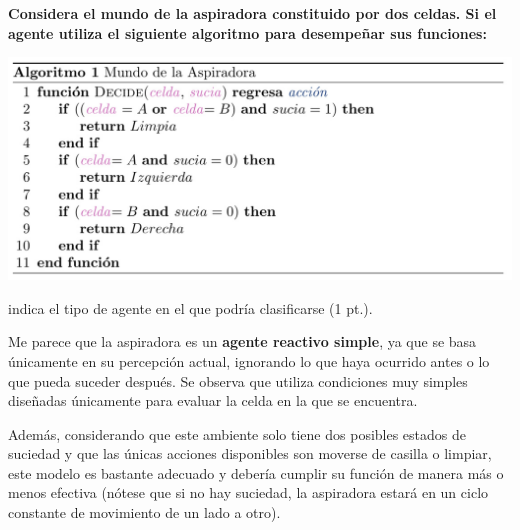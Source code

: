 \textbf{Considera el mundo de la aspiradora constituido por dos celdas. Si el agente utiliza el siguiente algoritmo para desempeñar sus funciones:}

\includegraphics[width=16cm]{src/Img/Screenshot_20250224_024900.png}

indica el tipo de agente en el que podría clasificarse (1 pt.). \vspace{.3cm}

Me parece que la aspiradora es un \textbf{agente reactivo simple}, ya que se basa únicamente en su percepción actual, ignorando lo que haya ocurrido antes o lo que pueda suceder después. Se observa que utiliza condiciones muy simples diseñadas únicamente para evaluar la celda en la que se encuentra. \vspace{.2cm}

Además, considerando que este ambiente solo tiene dos posibles estados de suciedad y que las únicas acciones disponibles son moverse de casilla o limpiar, este modelo es bastante adecuado y debería cumplir su función de manera más o menos efectiva (nótese que si no hay suciedad, la aspiradora estará en un ciclo constante de movimiento de un lado a otro).  
